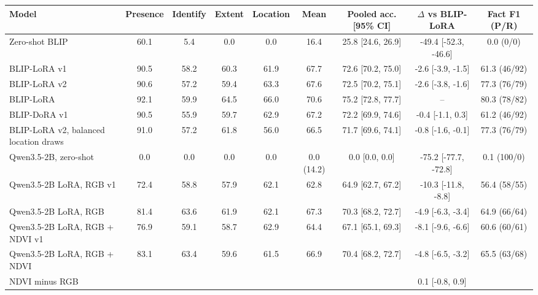 \begin{tabular}{lcccccccc}
\toprule
Model & Presence & Identify & Extent & Location & Mean & Pooled acc. [95\% CI] & $\Delta$ vs BLIP-LoRA & Fact F1 (P/R) \\
\midrule
Zero-shot BLIP & 60.1 & 5.4 & 0.0 & 0.0 & 16.4 & 25.8 [24.6, 26.9] & -49.4 [-52.3, -46.6] & 0.0 (0/0) \\
BLIP-LoRA v1 & 90.5 & 58.2 & 60.3 & 61.9 & 67.7 & 72.6 [70.2, 75.0] & -2.6 [-3.9, -1.5] & 61.3 (46/92) \\
BLIP-LoRA v2 & 90.6 & 57.2 & 59.4 & 63.3 & 67.6 & 72.5 [70.2, 75.1] & -2.6 [-3.8, -1.6] & 77.3 (76/79) \\
BLIP-LoRA & 92.1 & 59.9 & 64.5 & 66.0 & 70.6 & 75.2 [72.8, 77.7] & -- & 80.3 (78/82) \\
BLIP-DoRA v1 & 90.5 & 55.9 & 59.7 & 62.9 & 67.2 & 72.2 [69.9, 74.6] & -0.4 [-1.1, 0.3] & 61.2 (46/92) \\
BLIP-LoRA v2, balanced location draws & 91.0 & 57.2 & 61.8 & 56.0 & 66.5 & 71.7 [69.6, 74.1] & -0.8 [-1.6, -0.1] & 77.3 (76/79) \\
Qwen3.5-2B, zero-shot & 0.0 & 0.0 & 0.0 & 0.0 & 0.0 (14.2) & 0.0 [0.0, 0.0] & -75.2 [-77.7, -72.8] & 0.1 (100/0) \\
Qwen3.5-2B LoRA, RGB v1 & 72.4 & 58.8 & 57.9 & 62.1 & 62.8 & 64.9 [62.7, 67.2] & -10.3 [-11.8, -8.8] & 56.4 (58/55) \\
Qwen3.5-2B LoRA, RGB & 81.4 & 63.6 & 61.9 & 62.1 & 67.3 & 70.3 [68.2, 72.7] & -4.9 [-6.3, -3.4] & 64.9 (66/64) \\
Qwen3.5-2B LoRA, RGB + NDVI v1 & 76.9 & 59.1 & 58.7 & 62.9 & 64.4 & 67.1 [65.1, 69.3] & -8.1 [-9.6, -6.6] & 60.6 (60/61) \\
Qwen3.5-2B LoRA, RGB + NDVI & 83.1 & 63.4 & 59.6 & 61.5 & 66.9 & 70.4 [68.2, 72.7] & -4.8 [-6.5, -3.2] & 65.5 (63/68) \\
\midrule
NDVI minus RGB & \multicolumn{6}{c}{} & 0.1 [-0.8, 0.9] & \\
\bottomrule
\end{tabular}
